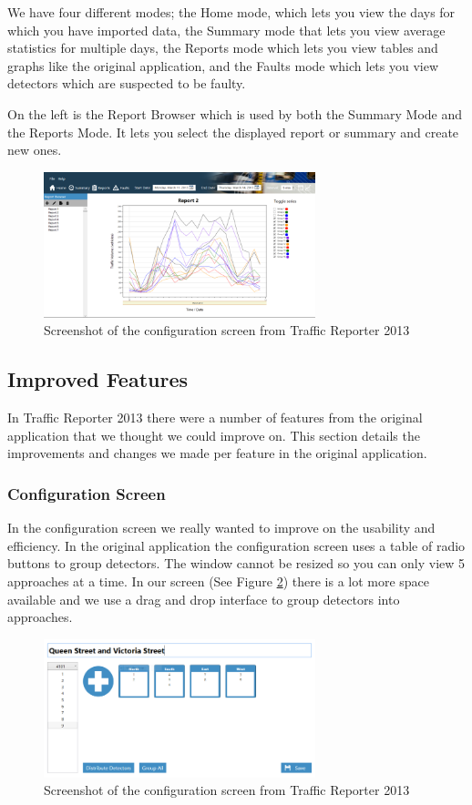 \documentclass{article}
\begin{document}
We have four different modes; the Home mode, which lets you view the days for which you have imported data, the Summary mode that lets you view average statistics for multiple days, the Reports mode which lets you view tables and graphs like the original application, and the Faults mode which lets you view detectors which are suspected to be faulty.

On the left is the Report Browser which is used by both the Summary Mode and the Reports Mode. It lets you select the displayed report or summary and create new ones.

\begin{figure}[!h]
\centerline{\includegraphics[width=3.1in]{overview}}
\caption{Screenshot of the configuration screen from Traffic Reporter 2013}
\label{fig:overview}
\end{figure}

\subsection{Improved Features}
In Traffic Reporter 2013 there were a number of features from the original application that we thought we could improve on. This section details the improvements and changes we made per feature in the original application.

\subsubsection{Configuration Screen}
In the configuration screen we really wanted to improve on the usability and efficiency. In the original application the configuration screen uses a table of radio buttons to group detectors. The window cannot be resized so you can only view 5 approaches at a time. In our screen (See Figure \ref{fig:newConfig}) there is a lot more space available and we use a drag and drop interface to group detectors into approaches. 

\begin{figure}[!t]
\centerline{\includegraphics[width=3.1in]{newConfig}}
\caption{Screenshot of the configuration screen from Traffic Reporter 2013}
\label{fig:newConfig}
\end{figure}
\end{document}
